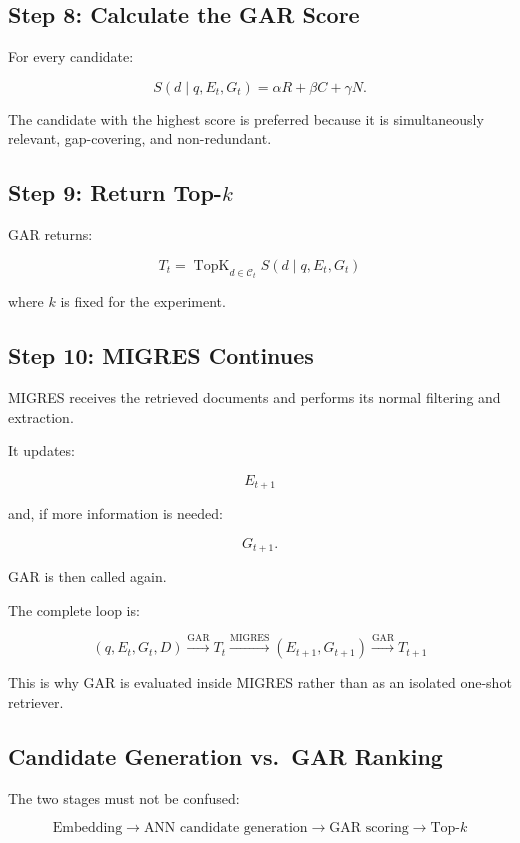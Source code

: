 \documentclass[11pt,a4paper]{article}
\begin{document}
\subsection{Step 8: Calculate the GAR Score}

For every candidate:

\[
S(d\mid q,E_t,G_t)
=
\alpha R+\beta C+\gamma N.
\]

The candidate with the highest score is preferred because it is simultaneously relevant, gap-covering, and non-redundant.

\subsection{Step 9: Return Top-$k$}

GAR returns:

\[
\boxed{
T_t=
\operatorname{TopK}_{d\in\mathcal C_t}
S(d\mid q,E_t,G_t)
}
\tag{11}
\]

where $k$ is fixed for the experiment.

\subsection{Step 10: MIGRES Continues}

MIGRES receives the retrieved documents and performs its normal filtering and extraction.

It updates:

\[
E_{t+1}
\]

and, if more information is needed:

\[
G_{t+1}.
\]

GAR is then called again.

The complete loop is:

\[
\boxed{
(q,E_t,G_t,D)
\xrightarrow{\mathrm{GAR}}
T_t
\xrightarrow{\mathrm{MIGRES}}
(E_{t+1},G_{t+1})
\xrightarrow{\mathrm{GAR}}
T_{t+1}
}
\]

This is why GAR is evaluated inside MIGRES rather than as an isolated one-shot retriever.

\subsection{Candidate Generation vs.\ GAR Ranking}

The two stages must not be confused:

\[
\boxed{
\text{Embedding}
\rightarrow
\text{ANN candidate generation}
\rightarrow
\text{GAR scoring}
\rightarrow
\text{Top-}k
}
\]
\end{document}
